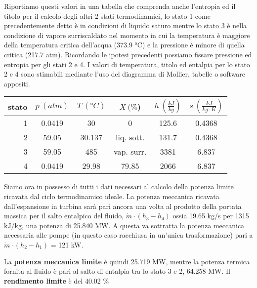 \documentclass[a4paper,12pt]{article}
\begin{document}
Riportiamo questi valori in una tabella che comprenda anche l'entropia ed il titolo per il calcolo degli altri 2 stati termodinamici,
lo stato 1 come precedentemente detto è in condizioni di liquido saturo mentre lo stato 3 è nella condizione di vapore surriscaldato
nel momento in cui la temperatura è maggiore della temperatura critica dell'acqua (373.9 °C) e la pressione è minore di quella critica
(217.7 atm).
Ricordando le ipotesi precedenti possiamo fissare pressione ed entropia per gli stati 2 e 4.
I valori di temperatura, titolo ed entalpia per lo stato 2 e 4 sono stimabili mediante l'uso del diagramma di Mollier,
tabelle o software appositi.
\begin{center}
    \begin{tabular}{r|c|c|c|c|c}
        stato    & $p\ (atm)$ & $T\ (\text{°}C) $&$X\ (\%$)& $h\ (\frac{kJ}{kg})$  & $s\ (\frac{kJ}{kg\cdot K})$\\ \hline
        1   &        0.0419 &            30   &    0      & 125.6    &0.4368 \\ \hline
        2   &        59.05    &          30.137&liq. sott.& 131.7    &0.4368 \\ \hline
        3   &        59.05   &           485  & vap. surr.& 3381     &6.837  \\ \hline
        4   &        0.0419       &      29.98&     79.85 & 2066     &6.837
    \end{tabular}
\end{center}

Siamo ora in possesso di tutti i dati necessari al calcolo della potenza limite ricavata dal ciclo termodinamico ideale.
La potenza meccanica ricavata dall'espansione in turbina sarà pari ancora una volta al prodotto della portata massica per il salto
entalpico del fluido, $\dot m \cdot (h_3 - h_4) $ ossia 19.65 kg/s per 1315 kJ/kg, una potenza di 25.840 MW.
A questa va sottratta la potenza meccanica necessaria alle pompe (in questo caso racchiusa in un'unica trasformazione)
pari a $\dot m \cdot (h_2 - h_1)$ = 121 kW.

La \textbf{potenza meccanica limite} è quindi 25.719 MW, mentre la potenza termica fornita al fluido è pari al salto di entalpia tra 
lo stato 3 e 2, 64.258 MW.
Il \textbf{rendimento limite} è del 40.02 \%
\end{document}
